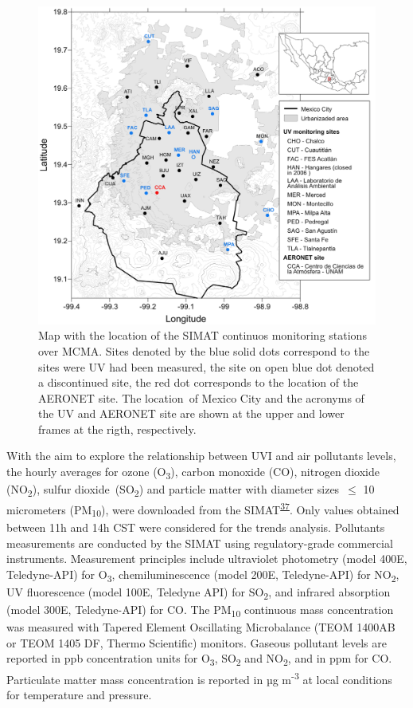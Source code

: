 \documentclass[10pt]{article}
\begin{document}
\begin{figure}[H]
\begin{center}
\includegraphics[width=0.70\columnwidth]{figures/MapaUV v4Dec20/MapaUV v4Dec20}
\caption{{Map with the location of the SIMAT continuos monitoring stations over
MCMA. Sites denoted by the blue solid dots correspond to the sites were
UV had been measured, the site on open blue dot denoted a discontinued
site, the red dot corresponds to the location of the AERONET site. The
location~of Mexico City and the acronyms of the UV and AERONET site are
shown at the upper and lower frames at the rigth, respectively.
{\label{977905}}%
}}
\end{center}
\end{figure}

With the aim to explore the relationship between UVI and air pollutants
levels, the hourly averages for ozone (O\textsubscript{3}), carbon
monoxide (CO), nitrogen dioxide (NO\textsubscript{2}), sulfur
dioxide~(SO\textsubscript{2}) and particle matter with diameter
sizes~\(\le\) 10 micrometers (PM\textsubscript{10}), were
downloaded from the SIMAT\textsuperscript{\hyperref[csl:37]{37}}. Only values obtained
between 11h and 14h CST were considered for the trends analysis.
Pollutants measurements are conducted by the SIMAT using
regulatory-grade commercial instruments. Measurement principles include
ultraviolet photometry (model 400E, Teledyne-API) for
O\textsubscript{3}, chemiluminescence (model 200E, Teledyne-API) for
NO\textsubscript{2}, UV fluorescence (model 100E, Teledyne API) for
SO\textsubscript{2}, and infrared absorption (model 300E, Teledyne-API)
for CO. The PM\textsubscript{10} continuous mass concentration was
measured with Tapered Element Oscillating Microbalance (TEOM 1400AB or
TEOM 1405 DF, Thermo Scientific) monitors. Gaseous pollutant levels are
reported in ppb concentration units for O\textsubscript{3},
SO\textsubscript{2} and NO\textsubscript{2}, and in ppm for CO.
Particulate matter mass concentration is reported in µg
m\textsuperscript{-3} at local conditions for temperature and pressure.
\end{document}
